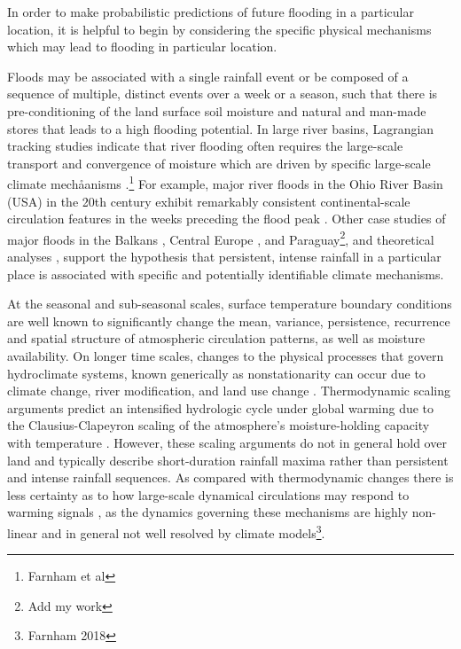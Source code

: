 \documentclass[12pt]{article}
\begin{document}
In order to make probabilistic predictions of future flooding in a particular location, it is helpful to begin by considering the specific physical mechanisms which may lead to flooding in particular location.

Floods may be associated with a single rainfall event or be composed of a sequence of multiple, distinct events over a week or a season, such that there is pre-conditioning of the land surface soil moisture and natural and man-made stores that leads to a high flooding potential.
In large river basins, Lagrangian tracking studies \citep{Gimeno2010} indicate that river flooding often requires the large-scale transport and convergence of moisture  which are driven by specific large-scale climate mechåanisms \citep{Dacre2014,Gimeno2014,Lu2013,Dirmeyer2010}.\footnote{Farnham et al}
For example, major river floods in the Ohio River Basin (USA) in the 20th century exhibit remarkably consistent continental-scale circulation features in the weeks preceding the flood peak \citep{Nakamura2012,Robertson2015}.
Other case studies of  major floods in the Balkans \citep{Stadtherr2016}, Central Europe \citep{Grams2014}, and Paraguay\footnote{Add my work}, and theoretical analyses \citep{Hoskins2015,Screen2014,Coumou2014}, support the hypothesis that persistent, intense rainfall in a particular place is associated with specific and potentially identifiable climate mechanisms.

At the seasonal and sub-seasonal scales, surface temperature boundary conditions are well known to significantly change the mean, variance, persistence, recurrence and spatial structure of atmospheric circulation patterns, as well as moisture availability.
On longer time scales, changes to the physical processes that govern hydroclimate systems, known generically as nonstationarity \citep{Milly2008} can occur due to climate change, river modification, and land use change \citep{Merz2014}.
Thermodynamic scaling arguments predict an intensified hydrologic cycle under global warming due to the Clausius-Clapeyron scaling of the atmosphere's moisture-holding capacity with temperature \citep[see][]{Muller2011,OGorman2015}.
However, these scaling arguments do not in general hold over land \citep{Byrne2015} and typically describe short-duration rainfall maxima rather than persistent and intense rainfall sequences.
As compared with thermodynamic changes there is less certainty as to how large-scale dynamical circulations may respond to warming signals \citep{Shaw2016,Barnes2015}, as the dynamics governing these mechanisms are highly non-linear \citep{Palmer2013} and in general not well resolved by climate models\footnote{Farnham 2018}.
\end{document}
